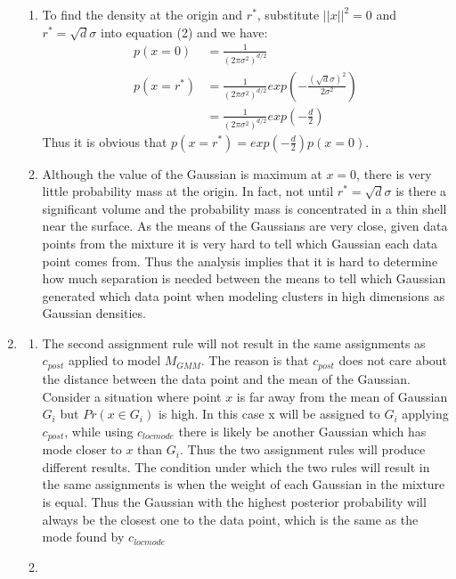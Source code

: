 \documentclass{article}
\begin{document}
\begin{enumerate}
\begin{enumerate}
    \item
        To find the density at the origin and $r^*$, substitute $||x||^2 = 0$ and $r^* = \sqrt{d}\sigma$ into equation (2) and we have:
    \begin{equation}
    \begin{split}
        p(x = 0) &= \frac{1}{(2\pi\sigma^2)^{d/2}}\\
        p(x = r^*) & = \frac{1}{(2\pi\sigma^2)^{d/2}}exp(-\frac{(\sqrt{d}\sigma)^2}{2\sigma^2})\\
                   &=\frac{1}{(2\pi\sigma^2)^{d/2}}exp(-\frac{d}{2})
    \end{split}
    \end{equation}
    Thus it is obvious that $p(x = r^*) = exp(-\frac{d}{2})p(x = 0)$.
    \item
        Although the value of the Gaussian is maximum at $x = 0$, there is very little probability mass at the origin. In fact, not until $r^* = \sqrt{d}\sigma$ is there a significant volume and the probability mass is concentrated in a thin shell near the surface. As the means of the Gaussians are very close, given data points from the mixture it is very hard to tell which Gaussian each data point comes from. Thus the analysis implies that it is hard to determine how much separation is needed between the means to tell which Gaussian generated which data point when modeling clusters in high dimensions as Gaussian densities. 
    \end{enumerate}
\item
    \begin{enumerate}
    \item
        The second assignment rule will not result in the same assignments as $c_{post}$ applied to model $M_{GMM}$. The reason is that $c_{post}$ does not care about the distance between the data point and the mean of the Gaussian. Consider a situation where point $x$ is far away from the mean of Gaussian $G_i$ but $Pr(x \in G_i)$ is high. In this case x will be assigned to $G_i$ applying $c_{post}$, while using $c_{locmode}$ there is likely be another Gaussian which has mode closer to $x$ than $G_i$. Thus the two assignment rules will produce different results. The condition under which the two rules will result in the same assignments is when the weight of each Gaussian in the mixture is equal. Thus the Gaussian with the highest posterior probability will always be the closest one to the data point, which is the same as the mode found by $c_{locmode}$
    \item

\end{enumerate}
\end{enumerate}
\end{document}
